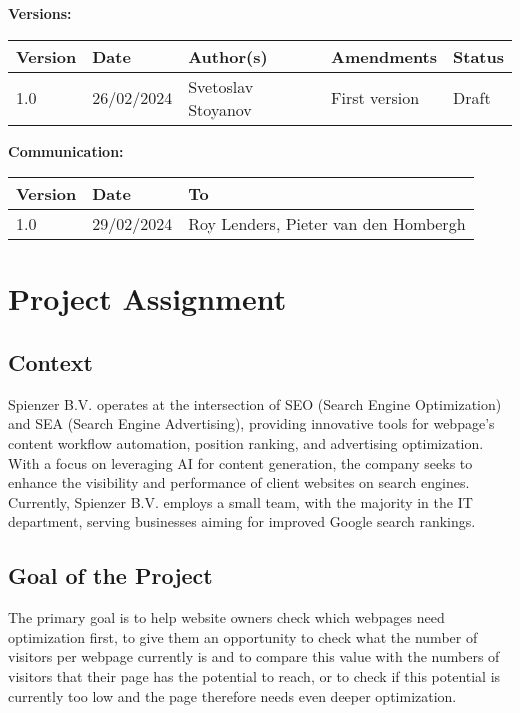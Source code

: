 \documentclass[12pt,a4paper]{article}
\begin{document}
\vspace{1em} %

\textbf{Versions:} 
\vspace{1em}

\begin{tabular}{|l|l|l|p{5cm}|l|}
    \hline
    Version & Date & Author(s) & Amendments & Status \\
    \hline
    1.0 & 26/02/2024 & Svetoslav Stoyanov & First version & Draft \\
    \hline
\end{tabular}

\vspace{1em} %

\textbf{Communication:} 
\vspace{1em} %

\begin{tabular}{|l|l|l|}
    \hline
    Version & Date & To \\
    \hline
    1.0 & 29/02/2024 & Roy Lenders, Pieter van den Hombergh \\
    \hline
\end{tabular}

\newpage

\tableofcontents
\newpage
\setcounter{page}{1}
\section{Project Assignment}
\subsection{Context}
Spienzer B.V. operates at the intersection of SEO (Search Engine Optimization) and SEA (Search Engine Advertising), providing innovative tools for webpage’s content workflow automation, position ranking, and advertising optimization. With a focus on leveraging AI for content generation, the company seeks to enhance the visibility and performance of client websites on search engines. Currently, Spienzer B.V. employs a small team, with the majority in the IT department, serving businesses aiming for improved Google search rankings.
\subsection{Goal of the Project}
The primary goal is to help website owners check which webpages need optimization first, to give them an opportunity to check what the number of visitors per webpage currently is and to compare this value with the numbers of visitors that their page has the potential to reach, or to check if this potential is currently too low and the page therefore needs even deeper optimization.
\end{document}

